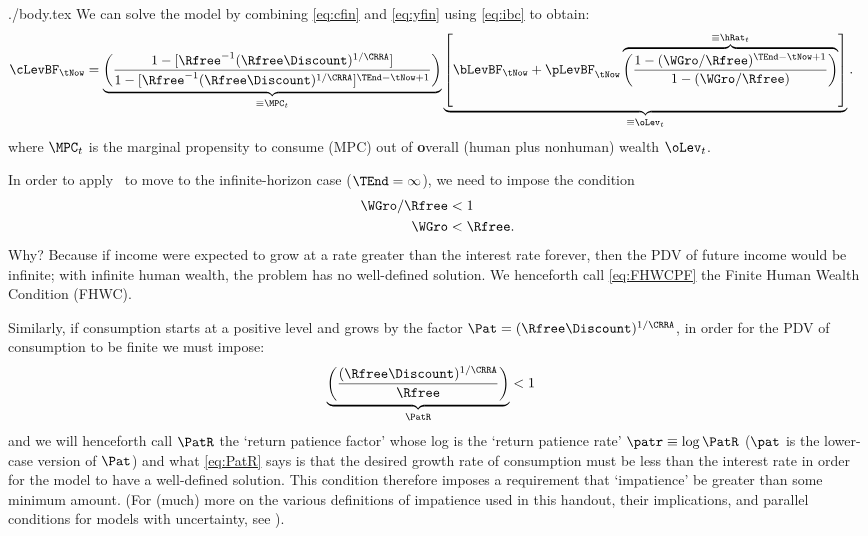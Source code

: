 \documentclass{handout}
\begin{document}
\begin{verbatimwrite}{./body.tex}
\hypertarget{cFuncAnalytical}{}
We can solve the model by combining \eqref{eq:cfin} and \eqref{eq:yfin} using 
\eqref{eq:ibc} to obtain:
\begin{equation}\begin{gathered}\begin{aligned}
        \cLevBF_{\tNow} & =  \underbrace{\left(\frac{1-[\Rfree^{-1}(\Rfree\Discount)^{1/\CRRA}]}{1-[\Rfree^{-1}(\Rfree\Discount)^{1/\CRRA}]^{\TEnd-\tNow+1}}\right)}_{\equiv \MPC_{t}} \underbrace{\left[\bLevBF_{\tNow}+\pLevBF_{\tNow}\overbrace{\left(\frac{1-({\WGro}/\Rfree)^{\TEnd-\tNow+1}}{1-({\WGro}/\Rfree)}\right)}^{\equiv \hRat_{t}}\right]}_{\equiv \oLev_{t}} \label{eq:cfinhoriz}.
\end{aligned}\end{gathered}\end{equation}
where $\MPC_{t}$ is the marginal propensity to consume (MPC) out of \textbf{o}verall (human plus nonhuman) wealth $\oLev_{t}$.

In order to apply \InfSum~to move to the infinite-horizon case ($\TEnd=\infty$), we need to impose the condition
\begin{equation}\begin{gathered}\begin{aligned}
        {\WGro}/\Rfree & <  1
\\  {\WGro}   & <  \Rfree.  \label{eq:FHWCPF}
\end{aligned}\end{gathered}\end{equation}
Why?  Because if income were expected to grow at a rate
greater than the interest rate forever, then the PDV of future income
would be infinite; with infinite human wealth, the problem has no
well-defined solution.  We henceforth call \eqref{eq:FHWCPF} the
Finite Human Wealth Condition (FHWC).

Similarly, if consumption starts at a positive level and grows by the factor $\Pat=(\Rfree \Discount)^{1/\CRRA}$, in order for the PDV of consumption to be finite we must impose:
\begin{equation}\begin{gathered}\begin{aligned}
        \underbrace{\left(\frac{(\Rfree\Discount)^{1/\CRRA}}{\Rfree}\right)}_{\PatR} & < 1  \label{eq:PatR}
\end{aligned}\end{gathered}\end{equation}
and we will henceforth call $\PatR$ the `return patience factor'
whose log is the `return patience rate' $\patr \equiv \log \PatR$ ($\pat$ is the lower-case version of $\Pat$) and
what \eqref{eq:PatR} says is that the desired growth rate of
consumption must be less than the interest rate in order for the model
to have a well-defined solution.  This condition therefore
imposes a requirement that `impatience' be greater than some minimum amount.  
(For (much) more on the various definitions of impatience used in this handout, their implications, and parallel conditions for models with uncertainty, see \cite{BufferStockTheory}).


\end{verbatimwrite}
\end{document}
